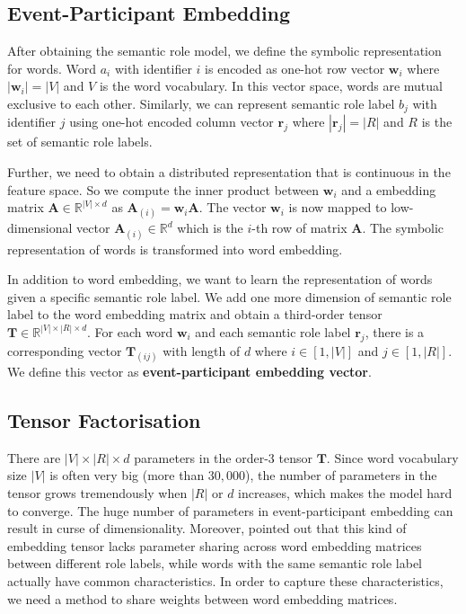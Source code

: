 \documentclass[a4paper]{article}
\begin{document}
\subsection{Event-Participant Embedding} \label{sec:epe}
After obtaining the semantic role model, we define the symbolic representation for words. Word $a_i$ with identifier $i$ is encoded as one-hot row vector $\mathbf{w}_i$ where $|\mathbf{w}_i| = |V|$ and $V$ is the word vocabulary. In this vector space, words are mutual exclusive to each other. Similarly, we can represent semantic role label $b_j$ with identifier $j$ using one-hot encoded column vector $\mathbf{r}_j$ where $|\mathbf{r}_j| = |R|$ and $R$ is the set of semantic role labels. 

Further, we need to obtain a distributed representation that is continuous in the feature space. So we compute the inner product between $\mathbf{w}_i$ and a embedding matrix $\mathbf{A} \in \mathbb{R}^{|V| \times d}$ as $\mathbf{A}_{(i)} = \mathbf{w}_i \mathbf{A}$. The vector $\mathbf{w}_i$ is now mapped to low-dimensional vector $\mathbf{A}_{(i)} \in \mathbb{R}^d$ which is the $i$-th row of matrix $\mathbf{A}$. The symbolic representation of words is transformed into word embedding. 

In addition to word embedding, we want to learn the representation of words given a specific semantic role label. We add one more dimension of semantic role label to the word embedding matrix and obtain a third-order tensor $\mathbf{T} \in \mathbb{R}^{|V| \times |R| \times d}$. For each word $\mathbf{w}_i$ and each semantic role label $\mathbf{r}_j$, there is a corresponding vector $\mathbf{T}_{(ij)}$ with length of $d$ where $i \in [1, |V|]$ and $j \in [1, |R|]$. We define this vector as \textbf{event-participant embedding vector}. 


\subsection{Tensor Factorisation} \label{sec:tf}
There are $|V| \times |R| \times d$ parameters in the order-3 tensor $\mathbf{T}$. Since word vocabulary size $|V|$ is often very big (more than $30,000$), the number of parameters in the tensor grows tremendously when $|R|$ or $d$ increases, which makes the model hard to converge. The huge number of parameters in event-participant embedding can result in curse of dimensionality. Moreover, \citep{tilk2016event} pointed out that this kind of embedding tensor lacks parameter sharing across word embedding matrices between different role labels, while words with the same semantic role label actually have common characteristics. In order to capture these characteristics, we need a method to share weights between word embedding matrices. 
\end{document}
